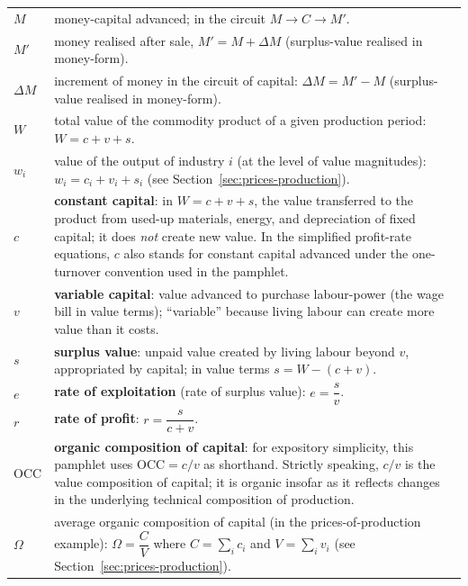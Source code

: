 \begin{longtable}{@{}>{\centering\arraybackslash}p{}@{\hspace{8pt}}%
                  >{\raggedright\arraybackslash}p{}@{}}
$M$ &
money-capital advanced; in the circuit $M \rightarrow C \rightarrow M'$. \\

$M'$ &
money realised after sale, $M' = M + \Delta M$ (surplus-value realised in money-form). \\

$\Delta M$ &
increment of money in the circuit of capital: $\Delta M = M' - M$ (surplus-value realised in money-form). \\

$W$ &
total value of the commodity product of a given production period: $W = c + v + s$. \\

$w_i$ &
value of the output of industry $i$ (at the level of value magnitudes): $w_i = c_i + v_i + s_i$ (see Section~\ref{sec:prices-production}). \\

$c$ &
\textbf{constant capital}: in \(W=c+v+s\), the value transferred to the product from used-up materials, energy, and depreciation of fixed capital; it does \emph{not} create new value. In the simplified profit-rate equations, \(c\) also stands for constant capital advanced under the one-turnover convention used in the pamphlet. \\

$v$ &
\textbf{variable capital}: value advanced to purchase labour-power (the wage bill in value terms); ``variable'' because living labour can create more value than it costs. \\

$s$ &
\textbf{surplus value}: unpaid value created by living labour beyond $v$, appropriated by capital; in value terms $s = W - (c+v)$. \\

$e$ &
\textbf{rate of exploitation} (rate of surplus value): $e = \dfrac{s}{v}$. \\

$r$ &
\textbf{rate of profit}: $r = \dfrac{s}{c+v}$. \\

$\mathrm{OCC}$ &
\textbf{organic composition of capital}: for expository simplicity, this pamphlet uses \(\mathrm{OCC}=c/v\) as shorthand. Strictly speaking, \(c/v\) is the value composition of capital; it is organic insofar as it reflects changes in the underlying technical composition of production. \\

$\Omega$ &
average organic composition of capital (in the prices-of-production example): $\Omega = \dfrac{C}{V}$ where $C=\sum_i c_i$ and $V=\sum_i v_i$ (see Section~\ref{sec:prices-production}). \\


\end{longtable}
